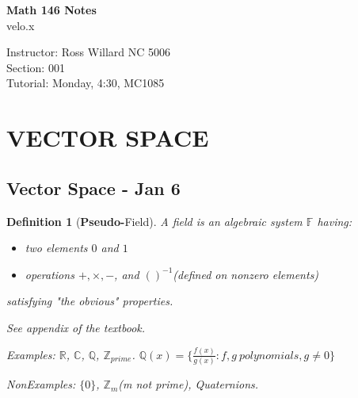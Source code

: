 \documentclass[12pt]{article}
\theoremstyle{plain}
\newtheorem{definition}{Definition}[subsection]
\begin{document}
\begin{titlepage}
\begin{center}
	\textbf{\large Math 146  Notes}\\[1ex]
	\large{velo.x}\\ 
\end{center}
\vfill
Instructor: Ross Willard NC 5006\\
Section: 001\\
Tutorial: Monday, 4:30, MC1085
\end{titlepage}
\newpage


\tableofcontents\label{toc}

\newpage



\section{VECTOR SPACE}
\subsection{Vector Space - Jan 6}
	\begin{definition}[\textbf{Pseudo-}Field]
		A field is an algebraic system $\mathbb{F}$ having:
		\begin{itemize}
			\item two elements $0$ and $1$
			\item operations $+, \times, -$, and $()^{-1}$(defined on nonzero 
				elements)
		\end{itemize}
		satisfying "the obvious" properties.
	
		See appendix of the textbook.

		Examples: $\mathbb{R}$, $\mathbb{C}$, $\mathbb{Q}$, $\mathbb{Z}_{prime}$.
		$\mathbb{Q}(x) = \{\frac{f(x)}{g(x)}:f,g\ polynomials, g\neq 0\}$

		NonExamples: $\{0\}$, $\mathbb{Z}_m$(m not prime), Quaternions. \\
	\end{definition}
	
\end{document}
